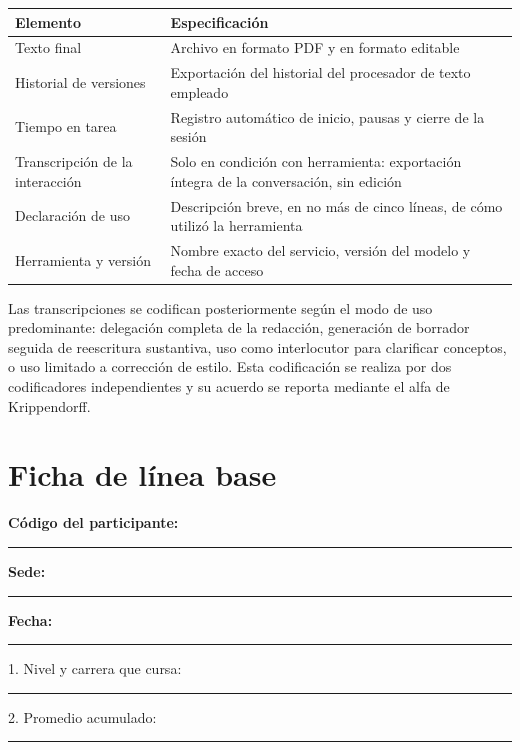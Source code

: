 \documentclass[12pt,a4paper,openany]{report}
\begin{document}
    \begin{table}[htbp]
        \centering
        \small
        \begin{tabular}{L{4.6cm} L{9.4cm}}
            \toprule
            \textbf{Elemento} & \textbf{Especificaci\'on} \\
            \midrule
            Texto final & Archivo en formato PDF y en formato editable \\
            Historial de versiones & Exportaci\'on del historial del procesador de texto empleado \\
            Tiempo en tarea & Registro autom\'atico de inicio, pausas y cierre de la sesi\'on \\
            Transcripci\'on de la interacci\'on & Solo en condici\'on con herramienta: exportaci\'on \'integra de la conversaci\'on, sin edici\'on \\
            Declaraci\'on de uso & Descripci\'on breve, en no m\'as de cinco l\'ineas, de c\'omo utiliz\'o la herramienta \\
            Herramienta y versi\'on & Nombre exacto del servicio, versi\'on del modelo y fecha de acceso \\
            \bottomrule
        \end{tabular}
    \end{table}
    
    Las transcripciones se codifican posteriormente seg\'un el modo de uso predominante: delegaci\'on completa de la redacci\'on, generaci\'on de borrador seguida de reescritura sustantiva, uso como interlocutor para clarificar conceptos, o uso limitado a correcci\'on de estilo. Esta codificaci\'on se realiza por dos codificadores independientes y su acuerdo se reporta mediante el alfa de Krippendorff.
    
    \chapter{Ficha de l\'inea base}
    \label{anx:linea}
    
    \textbf{C\'odigo del participante:} \rule{3.0cm}{0.4pt} \quad \textbf{Sede:} \rule{2.4cm}{0.4pt} \quad \textbf{Fecha:} \rule{2.2cm}{0.4pt}
    
    \vspace{8pt}
    1. Nivel y carrera que cursa: \rule{8cm}{0.4pt}
    
    \vspace{6pt}
    2. Promedio acumulado: \rule{2.5cm}{0.4pt}
    
\end{document}
